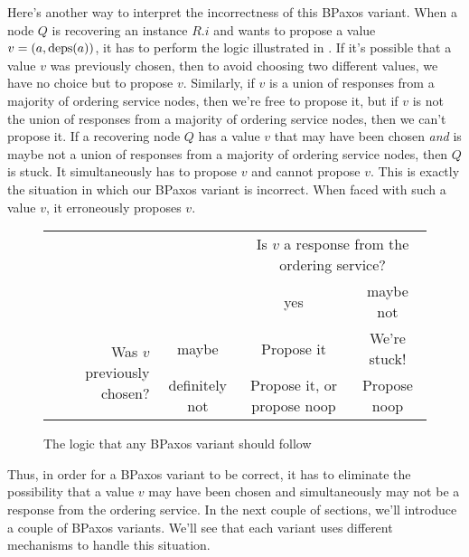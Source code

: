 Here's another way to interpret the incorrectness of this BPaxos variant. When
a node $Q$ is recovering an instance $R.i$ and wants to propose a value $v =
(a, \text{deps}(a))$, it has to perform the logic illustrated in
.
%
If it's possible that a value $v$ was previously chosen, then to avoid choosing
two different values, we have no choice but to propose $v$.
%
Similarly, if $v$ is a union of responses from a majority of ordering service
nodes, then we're free to propose it, but if $v$ is not the union of responses
from a majority of ordering service nodes, then we can't propose it.
%
If a recovering node $Q$ has a value $v$ that may have been chosen \emph{and}
is maybe not a union of responses from a majority of ordering service nodes,
then $Q$ is stuck. It simultaneously has to propose $v$ and cannot propose $v$.
This is exactly the situation in which our BPaxos variant is incorrect. When
faced with such a value $v$, it erroneously proposes $v$.

\begin{figure}[h]
  \centering
  \begin{tabular}{rccc}
    &
    &
    \multicolumn{2}{p{3in}}{%
      Is $v$ a response from the ordering service?
    } \\
    &
    &
    yes &
    maybe not \\\cline{3-4}
    \multirow{2}{1.8in}{Was $v$ previously chosen?} &
    maybe &
    \multicolumn{1}{|c|}{Propose it} &
    \multicolumn{1}{|c|}{We're stuck!} \\\cline{3-4}
    &
    definitely not &
    \multicolumn{1}{|c|}{Propose it, or propose noop} &
    \multicolumn{1}{|c|}{Propose noop} \\\cline{3-4}
  \end{tabular}
  \caption{The logic that any BPaxos variant should follow}%
\end{figure}

Thus, in order for a BPaxos variant to be correct, it has to eliminate the
possibility that a value $v$ may have been chosen and simultaneously may not be
a response from the ordering service. In the next couple of sections, we'll
introduce a couple of BPaxos variants. We'll see that each variant uses
different mechanisms to handle this situation.
